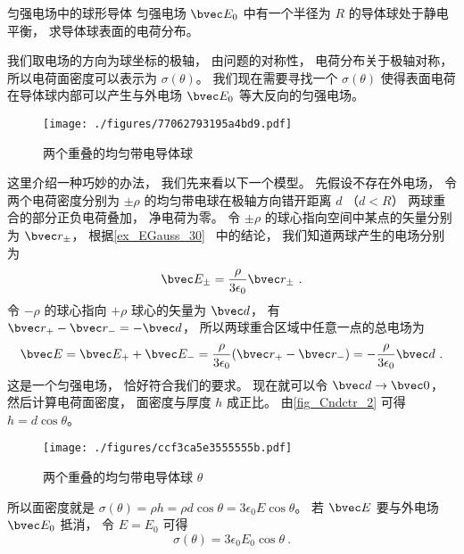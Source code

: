\begin{example}{匀强电场中的球形导体}
匀强电场 $\bvec E_0$ 中有一个半径为 $R$ 的导体球处于静电平衡， 求导体球表面的电荷分布。

我们取电场的方向为球坐标的极轴， 由问题的对称性， 电荷分布关于极轴对称， 所以电荷面密度可以表示为 $\sigma(\theta)$。 我们现在需要寻找一个 $\sigma(\theta)$ 使得表面电荷在导体球内部可以产生与外电场 $\bvec E_0$ 等大反向的匀强电场。

\begin{figure}[ht]
\centering
\texttt{[image: ./figures/77062793195a4bd9.pdf]}
\caption{两个重叠的均匀带电导体球} \label{fig_Cndctr_1}
\end{figure}

这里介绍一种巧妙的办法， 我们先来看以下一个模型。 先假设不存在外电场， 令两个电荷密度分别为 $\pm\rho$ 的均匀带电球在极轴方向错开距离 $d$ （$d < R$） 两球重合的部分正负电荷叠加， 净电荷为零。 令 $\pm\rho$ 的球心指向空间中某点的矢量分别为 $\bvec r_\pm$， 根据\autoref{ex_EGauss_30}~ 中的结论， 我们知道两球产生的电场分别为
\begin{equation}
\bvec E_\pm = \frac{\rho}{3\epsilon_0}\bvec r_\pm~.
\end{equation}
令 $-\rho$ 的球心指向 $+\rho$ 球心的矢量为 $\bvec d$， 有 $\bvec r_+ - \bvec r_- = -\bvec d$， 所以两球重合区域中任意一点的总电场为
\begin{equation}
\bvec E = \bvec E_+ + \bvec E_- = \frac{\rho}{3\epsilon_0}(\bvec r_+ - \bvec r_-) = -\frac{\rho}{3\epsilon_0}\bvec d~.
\end{equation}
这是一个匀强电场， 恰好符合我们的要求。 现在就可以令 $\bvec d\to \bvec 0$， 然后计算电荷面密度， 面密度与厚度 $h$ 成正比。 由\autoref{fig_Cndctr_2} 可得 $h = d\cos\theta$。

\begin{figure}[ht]
\centering
\texttt{[image: ./figures/ccf3ca5e3555555b.pdf]}
\caption{两个重叠的均匀带电导体球 $\theta$} \label{fig_Cndctr_2}
\end{figure}

所以面密度就是 $\sigma(\theta) = \rho h = \rho d\cos\theta = 3\epsilon_0 E \cos\theta$。 若 $\bvec E$ 要与外电场 $\bvec E_0$ 抵消， 令 $E = E_0$ 可得
\begin{equation}
\sigma(\theta) = 3\epsilon_0 E_0 \cos\theta~.
\end{equation}
\end{example}

